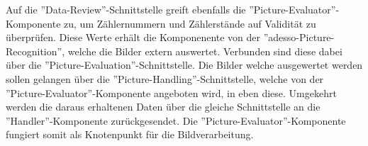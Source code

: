 Auf die ''Data-Review''-Schnittstelle greift ebenfalls die ''Picture-Evaluator''-Komponente zu, um Zählernummern und Zählerstände auf Validität zu überprüfen. Diese Werte erhält die Komponenente von der ''adesso-Picture-Recognition'', welche die Bilder extern auswertet. Verbunden sind diese dabei über die ''Picture-Evaluation''-Schnittstelle. Die Bilder welche ausgewertet werden sollen gelangen über die ''Picture-Handling''-Schnittstelle, welche von der ''Picture-Evaluator''-Komponente angeboten wird, in eben diese. Umgekehrt werden die daraus erhaltenen Daten über die gleiche Schnittstelle an die ''Handler''-Komponente zurückgesendet. Die ''Picture-Evaluator''-Komponente fungiert somit als Knotenpunkt für die Bildverarbeitung. 

